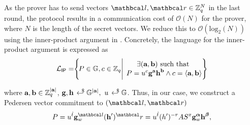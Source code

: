   As the prover has to send vectors $\lvec, \rvec \in \Z_q^N$ in the last round, the \proto protocol results in a communication cost of $\mathcal{O}(N)$ for the prover, where $N$ is the length of the secret vectors.
  We reduce this to $\mathcal{O}(\text{log}_2(N))$ using the inner-product argument in \cite{Bunz2018}. Concretely, the language for the inner-product argument is expressed as 
  \begin{equation}
    \L_{\textsf{IP}} = \hspace{-1mm}
    \left\{ 
    \hspace{-0.5mm}  
    P \in \G, c \in \Z_q \Bigg| 
    \text{
    \hspace{-3mm}
    \begin{tabular}{c}
    $\exists (\textbf{a}, \textbf{b}) \text{ such that }$
    \\ 
    $P = u^{c}\textbf{g}^{\textbf{a}} \textbf{h}^{\textbf{b}} \wedge c = \langle \textbf{a}, \textbf{b} \rangle$
    \end{tabular}
    \hspace{-3mm}
    }
    \hspace{-1.5mm}
    \right\}
    \label{eqnIPALanguage}
  \end{equation}
  
  
  \noindent where $\textbf{a}, \textbf{b} \in \mathbb{Z}_q^{|\textbf{a}|}$, $\textbf{g}, \textbf{h} \rgen \G^{|\textbf{a}|}, \ u \rgen \G$.
  Thus, in our case, we construct a Pedersen vector commitment to $(\lvec, \rvec)$
  \begin{align*}
    P = u^{\hat{t}} \textbf{g}^{\lvec}_w (\textbf{h}^{\prime})^\rvec = u^{\hat{t}} (h^{\prime})^{-r} AS^{x} \textbf{g}^{\vecnb{\alpha}}_w \textbf{h}^{\vecnb{\beta}},
  \end{align*}
  

